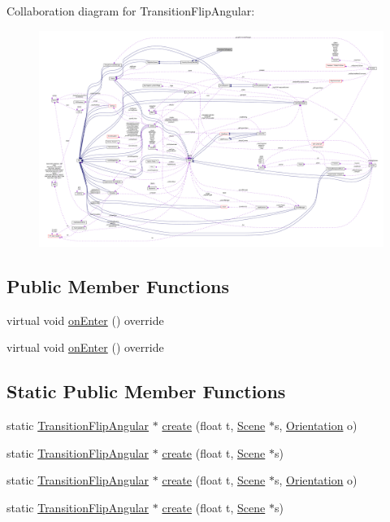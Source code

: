 Collaboration diagram for Transition\+Flip\+Angular\+:
\nopagebreak
\begin{figure}[H]
\begin{center}
\leavevmode
\includegraphics[width=350pt]{classTransitionFlipAngular__coll__graph}
\end{center}
\end{figure}
\subsection*{Public Member Functions}
\begin{DoxyCompactItemize}
\item 
virtual void \hyperlink{classTransitionFlipAngular_af9318ac2862656fa0853c2457994066f}{on\+Enter} () override
\item 
virtual void \hyperlink{classTransitionFlipAngular_a146fb601d0d9dfabbe0a833f6d08c58b}{on\+Enter} () override
\end{DoxyCompactItemize}
\subsection*{Static Public Member Functions}
\begin{DoxyCompactItemize}
\item 
static \hyperlink{classTransitionFlipAngular}{Transition\+Flip\+Angular} $\ast$ \hyperlink{classTransitionFlipAngular_a3b28f30b5abcededf90c769e05f38b82}{create} (float t, \hyperlink{classScene}{Scene} $\ast$s, \hyperlink{classTransitionScene_a0b2b247806fb10a20de0cbc554210c4d}{Orientation} o)
\item 
static \hyperlink{classTransitionFlipAngular}{Transition\+Flip\+Angular} $\ast$ \hyperlink{classTransitionFlipAngular_aa9192d093f0eda66916ffa355063617d}{create} (float t, \hyperlink{classScene}{Scene} $\ast$s)
\item 
static \hyperlink{classTransitionFlipAngular}{Transition\+Flip\+Angular} $\ast$ \hyperlink{classTransitionFlipAngular_a9405ac9229bbf23d75667e0cf4de51dc}{create} (float t, \hyperlink{classScene}{Scene} $\ast$s, \hyperlink{classTransitionScene_a0b2b247806fb10a20de0cbc554210c4d}{Orientation} o)
\item 
static \hyperlink{classTransitionFlipAngular}{Transition\+Flip\+Angular} $\ast$ \hyperlink{classTransitionFlipAngular_a1f8852d49fc40de55a35d679ca665248}{create} (float t, \hyperlink{classScene}{Scene} $\ast$s)
\end{DoxyCompactItemize}
